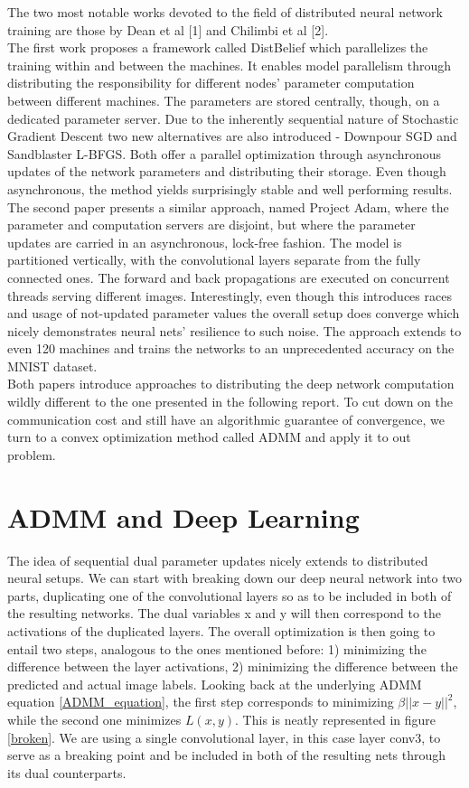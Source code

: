 \documentclass[letterpaper]{article}
\begin{document}
The two most notable works devoted to the field of distributed neural network training are those by Dean et al [1] and Chilimbi et al [2]. \\
The first work proposes a framework called DistBelief which parallelizes the training within and between the machines. It enables model parallelism through distributing the responsibility for different nodes' parameter computation between different machines. The parameters are stored centrally, though, on a dedicated parameter server. Due to the inherently sequential nature of Stochastic Gradient Descent two new alternatives are also introduced - Downpour SGD and Sandblaster L-BFGS. Both offer a parallel optimization through asynchronous updates of the network parameters and distributing their storage. Even though asynchronous, the method yields surprisingly stable and well performing results.\\
The second paper presents a similar approach, named Project Adam, where the parameter and computation servers are disjoint, but where the parameter updates are carried in an asynchronous, lock-free fashion. The model is partitioned vertically, with the convolutional layers separate from the fully connected ones. The forward and back propagations are executed on concurrent threads serving different images. Interestingly, even though this introduces races and usage of not-updated parameter values the overall setup does converge which nicely demonstrates neural nets' resilience to such noise. The approach extends to even 120 machines and trains the networks to an unprecedented accuracy on the MNIST dataset. \\

Both papers introduce approaches to distributing the deep network computation wildly different to the one presented in the following report. To cut down on the communication cost and still have an algorithmic guarantee of convergence, we turn to a convex optimization method called ADMM and apply it to out problem.


\section{ADMM and Deep Learning}

The idea of sequential dual parameter updates nicely extends to distributed neural setups. We can start with breaking down our deep neural network into two parts, duplicating one of the convolutional layers so as to be included in both of the resulting networks. The dual variables x and y will then correspond to the activations of the duplicated layers. The overall optimization is then going to entail two steps, analogous to the ones mentioned before: 1) minimizing the difference between the layer activations, 2) minimizing the difference between the predicted and actual image labels. Looking back at the underlying ADMM equation \ref{ADMM_equation}, the first step corresponds to minimizing $\beta||x-y||^2$, while the second one minimizes $L(x,y)$. This is neatly represented in figure \ref{broken}. We are using a single convolutional layer, in this case layer conv3, to serve as a breaking point and be included in both of the resulting nets through its dual counterparts.
\end{document}
